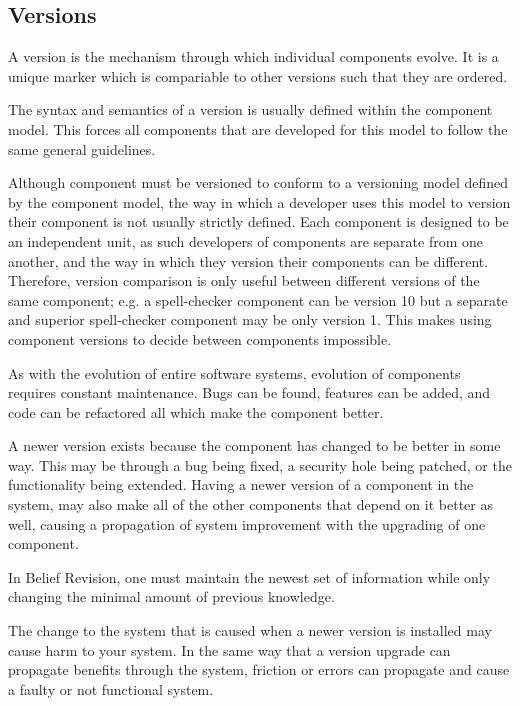 \subsection{Versions}
A version is the mechanism through which individual components evolve.
It is a unique marker which is compariable to other versions such that they are ordered.

The syntax and semantics of a version is usually defined within the component model.
This forces all components that are developed for this model to follow the same general guidelines.

Although component must be versioned to conform to a versioning model defined by the component model, 
the way in which a developer uses this model to version their component is not usually strictly defined.
Each component is designed to be an independent unit, as such developers of components are separate from one another,
and the way in which they version their components can be different.
Therefore, version comparison is only useful between different versions of the same component;
e.g. a spell-checker component can be version 10 but a separate and superior spell-checker component may be only version 1.
This makes using component versions to decide between components impossible.

As with the evolution of entire software systems, evolution of components requires constant maintenance.
Bugs can be found, features can be added, and code can be refactored all which make the component better.

A newer version exists because the component has changed to be better in some way.
This may be through a bug being fixed, a security hole being patched, or the functionality being extended.
Having a newer version of a component in the system, may also make all of the other components that depend on it better as well,
causing a propagation of system improvement with the upgrading of one component.

In Belief Revision, one must maintain the newest set of information while only changing the minimal amount of previous knowledge. 

The change to the system that is caused when a newer version is installed may cause harm to your system.
In the same way that a version upgrade can propagate benefits through the system, 
friction or errors can propagate and cause a faulty or not functional system.


